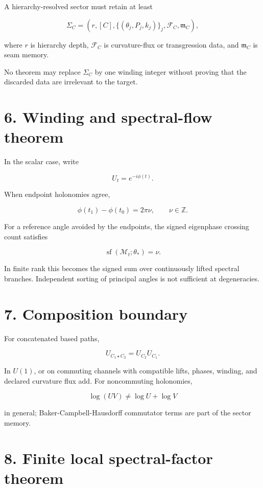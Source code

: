 A hierarchy-resolved sector must retain at least

\[
\Sigma_C=
\left(
 r,[C],\{(\theta_j,P_j,k_j)\}_j,
 \mathcal F_C,\mathfrak m_C
\right),
\]

where \(r\) is hierarchy depth, \(\mathcal F_C\) is curvature-flux or transgression data, and \(\mathfrak m_C\) is seam memory.

No theorem may replace \(\Sigma_C\) by one winding integer without proving that the discarded data are irrelevant to the target.

\hypertarget{winding-and-spectral-flow-theorem}{%
\section{6. Winding and spectral-flow theorem}\label{winding-and-spectral-flow-theorem}}

In the scalar case, write

\[
U_t=e^{-i\phi(t)}.
\]

When endpoint holonomies agree,

\[
\phi(t_1)-\phi(t_0)=2\pi\nu,
\qquad \nu\in\mathbb Z.
\]

For a reference angle avoided by the endpoints, the signed eigenphase crossing count satisfies

\[
\boxed{\operatorname{sf}(\mathcal M_t;\theta_*)=\nu.}
\]

In finite rank this becomes the signed sum over continuously lifted spectral branches. Independent sorting of principal angles is not sufficient at degeneracies.

\hypertarget{composition-boundary}{%
\section{7. Composition boundary}\label{composition-boundary}}

For concatenated based paths,

\[
U_{C_1\star C_2}=U_{C_2}U_{C_1}.
\]

In \(U(1)\), or on commuting channels with compatible lifts, phases, winding, and declared curvature flux add. For noncommuting holonomies,

\[
\log(UV)\neq \log U+\log V
\]

in general; Baker-Campbell-Hausdorff commutator terms are part of the sector memory.

\hypertarget{finite-local-spectral-factor-theorem}{%
\section{8. Finite local spectral-factor theorem}\label{finite-local-spectral-factor-theorem}}

